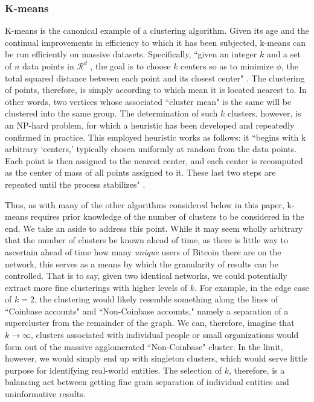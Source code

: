 \documentclass[journal]{IEEEtran}
\begin{document}
\subsubsection{K-means}
K-means is the canonical example of a clustering algorithm. Given its age and the continual improvements in efficiency to which it has been subjected, k-means can be run efficiently on massive datasets. Specifically, ``given an integer $k$ and a set of $n$ data points in $\mathcal{R}^d$ , the goal is to choose $k$ centers so as to minimize $\phi$, the total squared distance between each point and its closest center" \cite{k-means}. The clustering of points, therefore, is simply according to which mean it is located nearest to. In other words, two vertices whose associated ``cluster mean" is the same will be clustered into the same group. The determination of such $k$ clusters, however, is an NP-hard problem, for which a heuristic has been developed and repeatedly confirmed in practice. This employed heuristic works as follows: it ``begins with k arbitrary `centers,' typically chosen uniformly at random from the data points. Each point is then assigned to the nearest center, and each center is recomputed as the center of mass of all points assigned to it. These last two steps are repeated until the process stabilizes" \cite{k-means}. 

Thus, as with many of the other algorithms considered below in this paper, k-means requires prior knowledge of the number of clusters to be considered in the end. We take an aside to address this point. While it may seem wholly arbitrary that the number of clusters be known ahead of time, as there is little way to ascertain ahead of time how many \textit{unique} users of Bitcoin there are on the network, this serves as a means by which the granularity of results can be controlled. That is to say, given two identical networks, we could potentially extract more fine clusterings with higher levels of $k$. For example, in the edge case of $k=2$, the clustering would likely resemble something along the lines of ``Coinbase accounts" and ``Non-Coinbase accounts," namely a separation of a supercluster from the remainder of the graph. We can, therefore, imagine that $k\rightarrow\infty$, clusters associated with individual people or small organizations would form out of the massive agglomerated ``Non-Coinbase" cluster. In the limit, however, we would simply end up with singleton clusters, which would serve little purpose for identifying real-world entities. The selection of $k$, therefore, is a balancing act between getting fine grain separation of individual entities and uninformative results.
\end{document}

